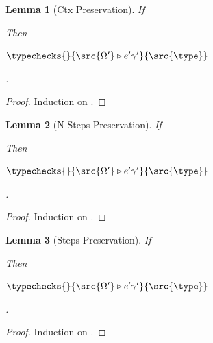 \documentclass[a4paper,names,dvipsnames]{article}
\newtheorem{lemma}{Lemma}
\begin{document}
\begin{lemma}[Ctx Preservation]\label{lem:ctx-preservation}
  If
  Then
  \begin{goals}
    \item $\typechecks{}{\src{\Omega'}\triangleright e'\gamma'}{\src{\type}}$
  \end{goals}.
\end{lemma}
\begin{proof}
  Induction on .
\end{proof}

\begin{lemma}[N-Steps Preservation]\label{lem:nsteps-preservation}
  If
  Then
  \begin{goals}
    \item $\typechecks{}{\src{\Omega'}\triangleright e'\gamma'}{\src{\type}}$
  \end{goals}.
\end{lemma}
\begin{proof}
  Induction on .
\end{proof}

\begin{lemma}[Steps Preservation]\label{lem:steps-preservation}
  If
  Then
  \begin{goals}
    \item $\typechecks{}{\src{\Omega'}\triangleright e'\gamma'}{\src{\type}}$
  \end{goals}.
\end{lemma}
\begin{proof}
  Induction on .
\end{proof}
\end{document}
